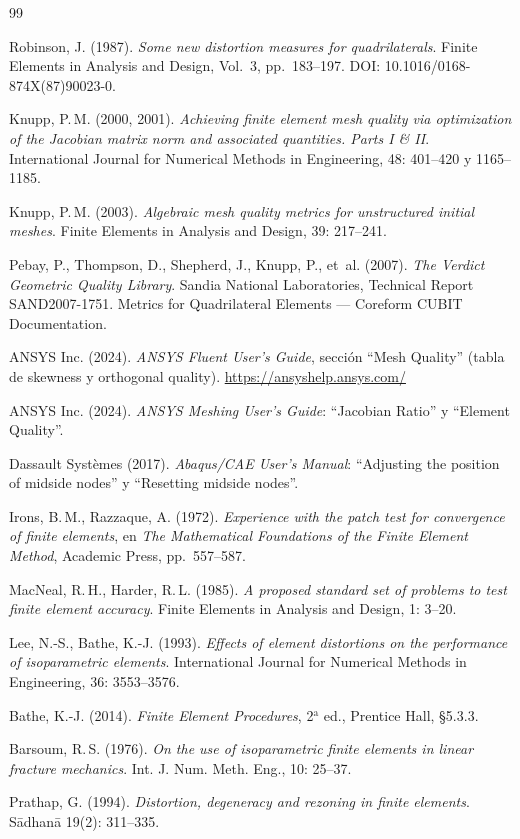 \documentclass[11pt,a4paper]{article}
\begin{document}
\begin{thebibliography}{99}

Robinson, J. (1987). \emph{Some new distortion measures for quadrilaterals}. Finite Elements in Analysis and Design, Vol.~3, pp.~183--197. DOI: 10.1016/0168-874X(87)90023-0.

Knupp, P.\,M. (2000, 2001). \emph{Achieving finite element mesh quality via optimization of the Jacobian matrix norm and associated quantities. Parts I \& II}. International Journal for Numerical Methods in Engineering, 48: 401--420 y 1165--1185.

Knupp, P.\,M. (2003). \emph{Algebraic mesh quality metrics for unstructured initial meshes}. Finite Elements in Analysis and Design, 39: 217--241.

Pebay, P., Thompson, D., Shepherd, J., Knupp, P., et~al. (2007). \emph{The Verdict Geometric Quality Library}. Sandia National Laboratories, Technical Report SAND2007-1751. Metrics for Quadrilateral Elements --- Coreform CUBIT Documentation.

ANSYS Inc. (2024). \emph{ANSYS Fluent User's Guide}, secci\'on ``Mesh Quality'' (tabla de skewness y orthogonal quality). \url{https://ansyshelp.ansys.com/}

ANSYS Inc. (2024). \emph{ANSYS Meshing User's Guide}: ``Jacobian Ratio'' y ``Element Quality''.

Dassault Syst\`emes (2017). \emph{Abaqus/CAE User's Manual}: ``Adjusting the position of midside nodes'' y ``Resetting midside nodes''.

Irons, B.\,M., Razzaque, A. (1972). \emph{Experience with the patch test for convergence of finite elements}, en \emph{The Mathematical Foundations of the Finite Element Method}, Academic Press, pp.~557--587.

MacNeal, R.\,H., Harder, R.\,L. (1985). \emph{A proposed standard set of problems to test finite element accuracy}. Finite Elements in Analysis and Design, 1: 3--20.

Lee, N.-S., Bathe, K.-J. (1993). \emph{Effects of element distortions on the performance of isoparametric elements}. International Journal for Numerical Methods in Engineering, 36: 3553--3576.

Bathe, K.-J. (2014). \emph{Finite Element Procedures}, 2$^{\text{a}}$ ed., Prentice Hall, \S 5.3.3.

Barsoum, R.\,S. (1976). \emph{On the use of isoparametric finite elements in linear fracture mechanics}. Int. J. Num. Meth. Eng., 10: 25--37.

Prathap, G. (1994). \emph{Distortion, degeneracy and rezoning in finite elements}. S\=adhan\=a 19(2): 311--335.

\end{thebibliography}
\end{document}
